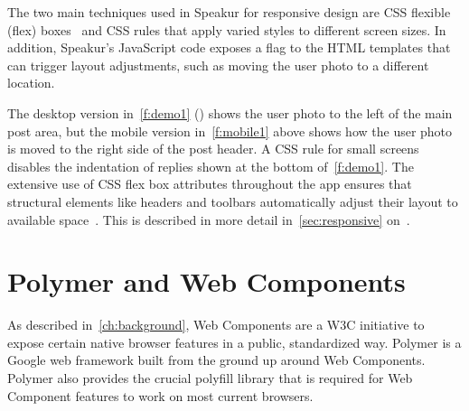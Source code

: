 The two main techniques used in Speakur for responsive design are CSS flexible (flex) boxes~\cite{mozillacontributors2015} 
and CSS  rules that apply varied styles to different screen sizes. 
In addition, Speakur's JavaScript code exposes a  flag to the HTML templates that can trigger layout adjustments, 
such as moving the user photo to a different location.

The desktop version in~\cref{f:demo1} () shows the user photo to the left of the main post area, 
but the mobile version in~\cref{f:mobile1} above shows how the user photo is moved to the right side of the post header. 
A CSS  rule for small screens disables the indentation of replies shown at the bottom of~\cref{f:demo1}. 
The extensive use of CSS flex box attributes throughout the app ensures that structural elements like headers and toolbars automatically adjust their layout to available space~\cite{polymercontributors2015-d}. 
This is described in more detail in~\cref{sec:responsive} on~.

\section{Polymer and Web Components}
As described in~\cref{ch:background}, 
Web Components are a 
W3C initiative 
to expose certain native browser features in a public, standardized way. 
Polymer is a 
Google 
web framework built from the ground up around Web Components.
Polymer also provides the crucial 
polyfill library 
that is required for Web Component features to work on most current browsers.

